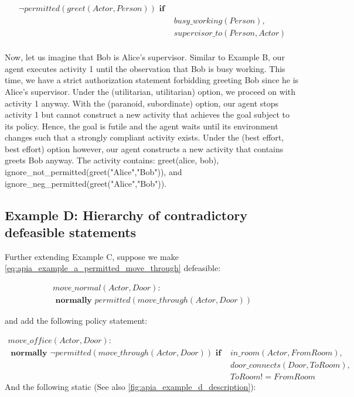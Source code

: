 \begin{equation}
\begin{split}
\neg permitted(greet(Actor, Person)) \textbf{ if } \\
    & busy\_working(Person), \\
    & supervisor\_to(Person, Actor) \\
\end{split}
\end{equation}

Now, let us imagine that Bob is Alice’s supervisor.
Similar to Example B, our agent executes activity 1 until the observation that Bob is busy working.
This time, we have a strict authorization statement forbidding greeting Bob since he is Alice’s supervisor.
Under the (utilitarian, utilitarian) option, we proceed on with activity 1 anyway.
With the (paranoid, subordinate) option, our agent stops activity 1 but cannot construct a new activity that achieves the goal subject to its policy.
Hence, the goal is futile and the agent waits until its environment changes such that a strongly compliant activity exists.
Under the (best effort, best effort) option however, our agent constructs a new activity that contains greets Bob anyway.
The activity contains: greet(alice, bob), ignore\_not\_permitted(greet("Alice","Bob")), and ignore\_neg\_permitted(greet("Alice","Bob")).

\subsection{Example D: Hierarchy of contradictory defeasible statements}

Further extending Example C, suppose we make \cref{eq:apia_example_a_permitted_move_through} defeasible:

\begin{equation}
\begin{split}
\label{eq:apia_example_d_move_normal}
move\_normal(Actor, Door): \\
\textbf{ normally } permitted(move\_through(Actor, Door))
\end{split}
\end{equation}

and add the following policy statement:

\begin{equation}
\begin{split}
\label{eq:apia_example_d_move_office}
move\_office(Actor, Door): \\
\textbf{ normally } \neg permitted(move\_through(Actor, Door)) \textbf{ if }
    & in\_room(Actor, FromRoom), \\
    & door\_connects(Door, ToRoom), \\
    & ToRoom != FromRoom
\end{split}
\end{equation}
And the following static (See also \cref{fig:apia_example_d_description}):

